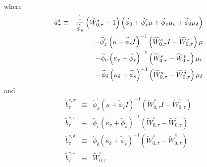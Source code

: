 \documentclass{article}
\begin{document}
where%
\begin{eqnarray*}
\widetilde{a}_{\tau }^{s} &\equiv &\frac{1}{\widetilde{\phi }_{s}}\left( 
\widetilde{W}_{0,\tau }^{s}-1\right) \left( \widetilde{\phi }_{0}+\widetilde{%
\phi }_{x}^{\prime }\mu +\widetilde{\phi }_{v}\mu _{v}+\widetilde{\phi }%
_{\delta }\mu _{\delta }\right) \\
&&-\widetilde{\phi }_{x}^{\prime }\left( \kappa +\widetilde{\phi }%
_{s}I\right) ^{-1}\left( \widetilde{W}_{0,\tau }^{s}I-\widetilde{W}_{0,\tau
}^{x}\right) \mu \\
&&-\widetilde{\phi }_{v}\left( \kappa _{v}+\widetilde{\phi }_{s}\right)
^{-1}\left( \widetilde{W}_{0,\tau }^{s}-\widetilde{W}_{0,\tau }^{v}\right)
\mu _{v} \\
&&-\widetilde{\phi }_{\delta }\left( \kappa _{\delta }+\widetilde{\phi }%
_{s}\right) ^{-1}\left( \widetilde{W}_{0,\tau }^{s}-\widetilde{W}_{0,\tau
}^{\delta }\right) \mu _{\delta }
\end{eqnarray*}%
and%
\begin{eqnarray*}
\tilde{b}_{\tau }^{s,x} &\equiv &\widetilde{\phi }_{x}^{\prime }\left(
\kappa +\widetilde{\phi }_{s}I\right) ^{-1}\left( \widetilde{W}_{0,\tau
}^{s}I-\widetilde{W}_{0,\tau }^{x}\right) \\
\tilde{b}_{\tau }^{s,v} &\equiv &\widetilde{\phi }_{v}\left( \kappa _{v}+%
\widetilde{\phi }_{s}\right) ^{-1}\left( \widetilde{W}_{0,\tau }^{s}-%
\widetilde{W}_{0,\tau }^{v}\right) \\
\tilde{b}_{\tau }^{s,\delta } &\equiv &\widetilde{\phi }_{\delta }\left(
\kappa _{\delta }+\widetilde{\phi }_{s}\right) ^{-1}\left( \widetilde{W}%
_{0,\tau }^{s}-\widetilde{W}_{0,\tau }^{\delta }\right) \\
\tilde{b}_{\tau }^{s,s} &\equiv &\widetilde{W}_{0,\tau }^{s}
\end{eqnarray*}
\end{document}
